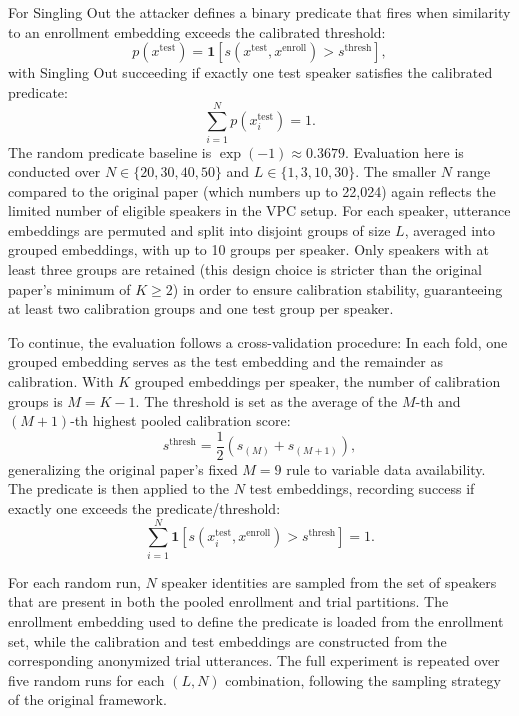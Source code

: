\documentclass[12pt,leqno,a4paper]{article}
\begin{document}
For Singling Out the attacker defines a binary predicate that fires when similarity to
an enrollment embedding exceeds the calibrated threshold:
\begin{equation}
p(x^{\mathrm{test}}) = \mathbf{1}
\left[
s(x^{\mathrm{test}}, x^{\mathrm{enroll}})
> s^{\mathrm{thresh}}
\right],
\end{equation}
with Singling Out succeeding if exactly one test speaker satisfies
the calibrated predicate:
\begin{equation}
\sum_{i=1}^{N}
p(x_i^{\mathrm{test}})
= 1.
\end{equation}
The random predicate baseline is $\exp(-1) \approx 0.3679$. Evaluation
here is conducted over $N \in \{20, 30, 40, 50\}$ and
$L \in \{1, 3, 10, 30\}$. The smaller $N$ range compared to the
original paper (which numbers up to 22,024) again reflects the limited number of
eligible speakers in the VPC setup. For each speaker, utterance
embeddings are permuted and split into disjoint groups of size $L$,
averaged into grouped embeddings, with up to 10 groups per speaker.
Only speakers with at least three groups are retained (this design choice is stricter than the original paper's minimum of $K \geq 2$) in order to ensure calibration
stability, guaranteeing at least two calibration groups and one test
group per speaker.

To continue, the evaluation follows a cross-validation procedure: In each fold,
one grouped embedding serves as the test embedding and the remainder
as calibration. With $K$ grouped embeddings per speaker, the number
of calibration groups is $M = K-1$. The threshold is set as the
average of the $M$-th and $(M+1)$-th highest pooled calibration score:
\begin{equation}
s^{\mathrm{thresh}} = \frac{1}{2}
\left(
s_{(M)} + s_{(M+1)}
\right),
\end{equation}
generalizing the original paper's fixed $M=9$ rule to variable data
availability. The predicate is then applied to the $N$ test embeddings,
recording success if exactly one exceeds the predicate/threshold:
\begin{equation}
\sum_{i=1}^{N}
\mathbf{1}
\left[
s(x_i^{\mathrm{test}}, x^{\mathrm{enroll}})
> s^{\mathrm{thresh}}
\right]
= 1.
\end{equation}

For each random run, $N$ speaker identities are sampled from the set of speakers that are present in both the pooled enrollment and trial partitions.
The enrollment embedding used to define the predicate is loaded from the enrollment set, while the calibration and test embeddings are constructed from the corresponding anonymized trial utterances.
The full experiment is repeated over five random runs for each $(L,N)$ combination, following the sampling strategy of the original framework.
\end{document}
